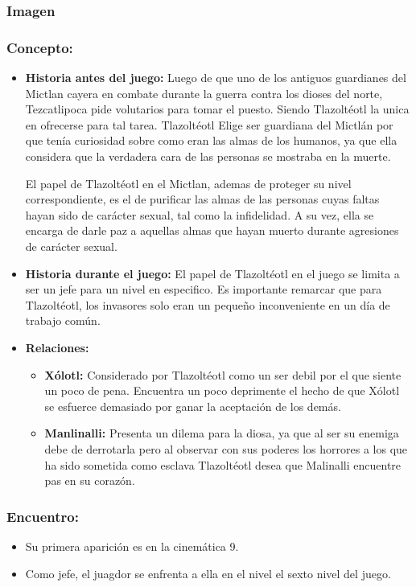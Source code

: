 \documentclass[11pt,letterpaper]{article}
\begin{document}
\subsubsection{Imagen}
\subsubsection{Concepto:}
\begin{itemize}
	\item \textbf{Historia antes del juego:}
	Luego de que uno de los antiguos guardianes del Mictlan cayera en combate durante la guerra contra los dioses del norte, Tezcatlipoca pide volutarios para tomar el puesto. Siendo Tlazoltéotl la unica en ofrecerse para tal tarea. Tlazoltéotl Elige ser guardiana del Mictlán por que tenía curiosidad sobre como eran las almas de los humanos, ya que ella considera que la verdadera cara de las personas se mostraba en la muerte.
	\\
	\par
	El papel de Tlazoltéotl en el Mictlan, ademas de proteger su nivel correspondiente, es el de purificar las almas de las personas cuyas faltas hayan sido de carácter sexual, tal como la infidelidad. A su vez, ella se encarga de darle paz a aquellas almas que hayan muerto durante agresiones de carácter sexual. 
	\item \textbf{Historia durante el juego:}
	El papel de  Tlazoltéotl en el juego se limita a ser un jefe para un nivel en especifico. Es importante remarcar que para  Tlazoltéotl, los invasores solo eran un pequeño inconveniente en un día de trabajo común.
	\item \textbf{Relaciones:}
	\begin{itemize}
		\item \textbf{Xólotl:} Considerado por Tlazoltéotl como un ser debil por el que siente un poco de pena. Encuentra un poco deprimente el hecho de que Xólotl se esfuerce demasiado por ganar la aceptación de los demás. 
		\item \textbf{Manlinalli:} Presenta un dilema para la diosa, ya que al ser su enemiga debe de derrotarla pero al observar con sus poderes los horrores a los que ha sido sometida como esclava  Tlazoltéotl desea que Malinalli encuentre pas en su corazón.
	\end{itemize}                     
\end{itemize}

\subsubsection{Encuentro:}
\begin{itemize}
	\item Su primera aparición es en la cinemática 9.
	\item Como jefe, el juagdor se enfrenta a ella en el nivel el sexto nivel del juego.
\end{itemize} 
\end{document}

